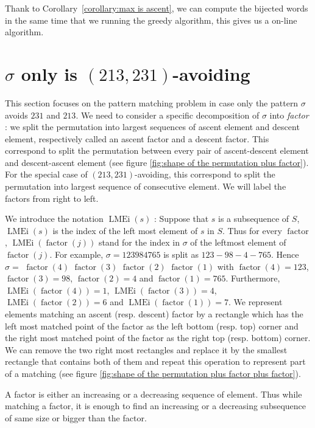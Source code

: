 \documentclass[a4paper]{llncs}
\DeclareMathOperator{\LMEi}{LMEi}
\DeclareMathOperator{\factor}{factor}
\begin{document}
Thank to Corollary~\ref{corollary:max is ascent},
we can compute the bijected words in the same time that we running the greedy algorithm, this gives us a on-line algorithm.


\section{$\sigma$ only is $(213,231)$-avoiding}
\label{section:sigma only avoid 231 and 213}

This section focuses on the pattern matching problem
in case only the pattern $\sigma$ avoids $231$ and $213$.
We need to consider a specific decomposition of $\sigma$ into \textit{factor} :
we split the permutation into largest sequences of ascent element and descent element, respectively called an ascent factor and a descent factor.
This correspond to split the permutation between every pair of ascent-descent element and descent-ascent element (see figure \ref{fig:shape of the permutation plus factor}).
For the special case of $(213,231)$-avoiding, this correspond to split the permutation into largest sequence of consecutive element.
We will label the factors from right to left.

We introduce the notation $\LMEi(s)$ : Suppose that $s$ is a subsequence of $S$, $\LMEi(s)$ is the index of the left most element of $s$ in $S$. Thus
for every $\factor$, $\LMEi(\factor(j))$ stand for the index in $\sigma$
of the leftmost element of $\factor(j)$.
For example,
$\sigma = 123984765$ is split as
 $123-98-4-765$. 
Hence
$\sigma =$ $\factor(4)$ $\factor(3)$ $\factor(2)$ $\factor(1)$ with
$\factor(4) =123$, $\factor(3) = 98$, $\factor(2) = 4$ and $\factor(1) = 765$.
Furthermore,
$\LMEi(\factor(4)) = 1$, $\LMEi(\factor(3)) = 4$, $\LMEi(\factor(2)) = 6$ and $\LMEi(\factor(1)) = 7$.
We represent elements matching an ascent (resp. descent) factor 
by a rectangle which has the left most matched point of the factor as the left bottom (resp. top) corner and the right most matched point of the factor as the right top (resp. bottom) corner.
We can remove the two right most rectangles and replace it by the smallest rectangle that contains both of them and repeat this operation to represent part of a matching (see figure \ref{fig:shape of the permutation plus factor plus factor}).

\begin{remark}
A factor is either an increasing or a decreasing sequence of element. Thus while matching a factor, it is enough to find an increasing or a decreasing subsequence of same size or bigger than the factor.
\end{remark}
\end{document}
